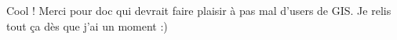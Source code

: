 \documentclass[a4paper]{article}
\begin{document}
\beginnumbering
\pstart
Cool ! Merci pour  doc qui devrait faire plaisir à pas mal d’users de GIS. Je relis tout ça dès que j’ai un moment :)
\pend
\endnumbering
\printindex
\end{document}
